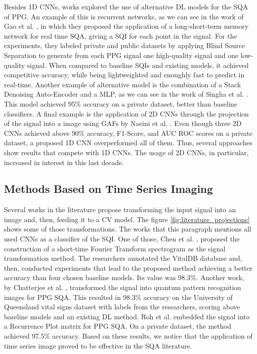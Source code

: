 Besides 1D \gls{CNN}s, works explored the use of alternative \gls{DL} models for the \gls{SQA} of \gls{PPG}. An example of this is recurrent networks, as we can see in the work of Gao et al. \cite{deep-learning-4}, in which they proposed the application of a long-short-term memory network for real time \gls{SQA}, giving a \gls{SQI} for each point in the signal. For the experiments, they labeled private and public datasets by applying Blind Source Separation to generate from each \gls{PPG} signal one high-quality signal and one low-quality signal. When compared to baseline \gls{SQI}s and existing models, it achieved competitive accuracy, while being lightweighted and enoughly fast to predict in real-time. Another example of alternative model is the combination of a Stack Denoising Auto-Encoder and a \gls{MLP}, as we can see in the work of Singha et al. \cite{deep-learning-5}. This model achieved 95\% accuracy on a private dataset, better than baseline classifiers. A final example is the application of 2D \glspl{CNN} through the projection of the signal into a image using \glspl{GAF} by Naeini et al. \cite{deep-learning-6}. Even though three 2D \glspl{CNN} achieved above 90\% accuracy, F1-Score, and \gls{AUC} \gls{ROC} scores on a private dataset, a proposed 1D \gls{CNN} overperformed all of them. Thus, several approaches show results that compete with 1D \glspl{CNN}. The usage of 2D \glspl{CNN}, in particular, increased in interest in this last decade.


\subsection{Methods Based on Time Series Imaging}
\label{sec:imaging}

Several works in the literature propose transforming the input signal into an image and, then, feeding it to a \gls{CV} model. The figure \ref{fig:literature_projections} shows some of those transformations. The works that this paragraph mentions all used \gls{CNN}s as a classifier of the \gls{SQI}. One of those, Chen et al. \cite{imaging-1}, proposed the construction of a short-time Fourier Transform spectrogram as the signal transformation method. The researchers annotated the VitalDB database and, then, conducted experiments that lead to the proposed method achieving a better accuracy than four chosen baseline models. Its value was 98.3\%. Another work, by Chatterjee et al. \cite{imaging-2}, transformed the signal into quantum pattern recognition images for PPG \gls{SQA}. This resulted in 98.3\% accuracy on the University of Queensland vital signs dataset with labels from the researchers, scoring above baseline models and an existing \gls{DL} method. Roh et al. \cite{imaging-3} embedded the signal into a Recurrence Plot matrix for PPG \gls{SQA}. On a private dataset, the method achieved 97.5\% accuracy. Based on these results, we notice that the application of time series image proved to be effective in the \gls{SQA} literature.

